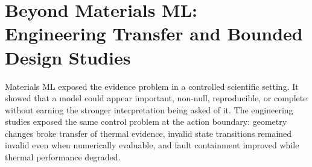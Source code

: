 \documentclass[11pt,a4paper,oneside]{report}
\begin{document}


%


%



%



%






%



%



%













\chapter[Beyond Materials ML]{Beyond Materials ML:\\ Engineering Transfer and Bounded Design Studies}

Materials ML exposed the evidence problem in a controlled scientific setting. It showed that a model could appear important, non-null, reproducible, or complete without earning the stronger interpretation being asked of it. The engineering studies exposed the same control problem at the action boundary: geometry changes broke transfer of thermal evidence, invalid state transitions remained invalid even when numerically evaluable, and fault containment improved while thermal performance degraded.
\end{document}
